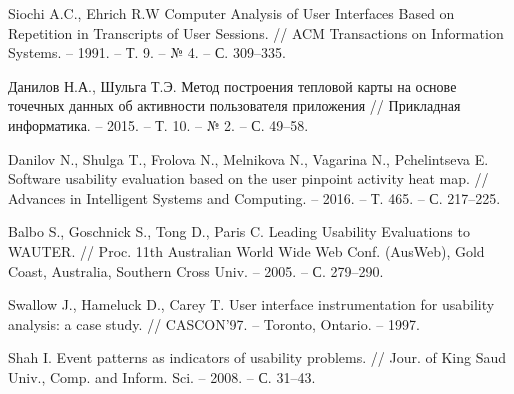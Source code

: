 
\begin{thebibliography}{1}
	Siochi A.C., Ehrich R.W
	Computer Analysis of User Interfaces Based on Repetition in Transcripts of User Sessions.
	// ACM Transactions on Information Systems. -- 1991. -- Т. 9. -- № 4. -- С. 309–335.
	
	Данилов Н.А., Шульга Т.Э.
	Метод построения тепловой карты на основе точечных данных об активности пользователя приложения
	// Прикладная информатика. -- 2015. -- Т. 10. -- № 2. -- С. 49–58.
	
	Danilov N., Shulga T., Frolova N., Melnikova N., Vagarina N., Pchelintseva E.
	Software usability evaluation based on the user pinpoint activity heat map.
	// Advances in Intelligent Systems and Computing. -- 2016. -- Т. 465. -- С. 217–225.
	
	Balbo S., Goschnick S., Tong D., Paris C.
	Leading Usability Evaluations to WAUTER.
	// Proc. 11th Australian World Wide Web Conf. (AusWeb), Gold Coast, Australia, Southern Cross Univ. -- 2005. -- С. 279–290.
	
	Swallow J., Hameluck D., Carey T.
	User interface	instrumentation for usability analysis: a case study.
	// CASCON’97. -- Toronto, Ontario. -- 1997.
	
	Shah I.
	Event patterns as indicators of usability problems.
	// Jour. of King Saud Univ., Comp. and Inform. Sci. -- 2008. -- С. 31–43.
	

\end{thebibliography}
